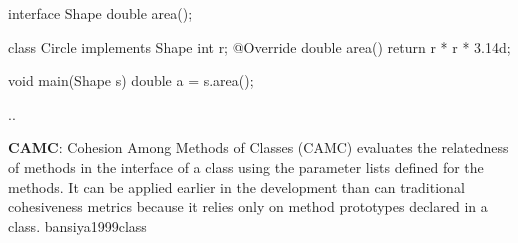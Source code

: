 \documentclass{article}
\begin{document}


\begin{pptWide}{2}
{\small\begin{ffcode}
interface Shape
  double area();

class Circle implements Shape
  int r;
  @Override
  double area()
    return r * r * 3.14d;

void main(Shape s)
  double a = s.area();
\end{ffcode}
}
\par\columnbreak\par
{}
\par
..
\end{pptWide}
\plush{}

  {\textbf{CAMC}: Cohesion Among Methods of Classes (CAMC) evaluates the relatedness of methods in the interface of a class using the parameter lists defined for the methods. It can be applied earlier in the development than can traditional cohesiveness metrics because it relies only on method prototypes declared in a class.}
  {bansiya1999class}
\end{document}

